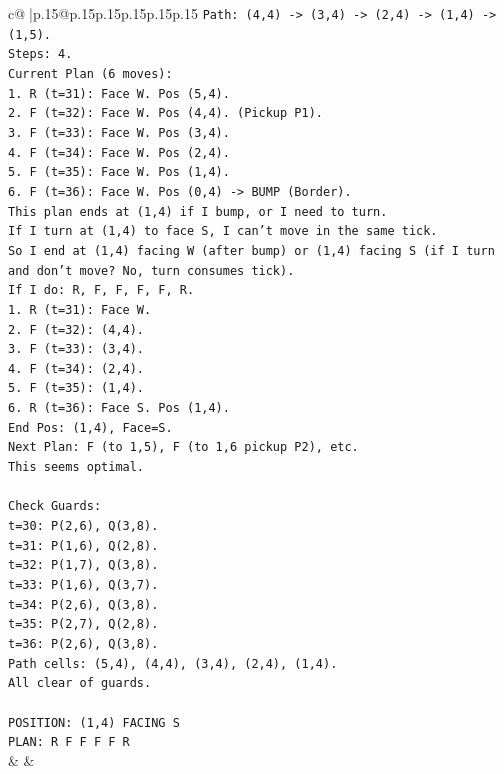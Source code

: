 \documentclass{article}
\begin{document}
{\begin{supertabular}{c@{$\;$}|p{.15\linewidth}@{}p{.15\linewidth}p{.15\linewidth}p{.15\linewidth}p{.15\linewidth}p{.15\linewidth}}
{{{\texttt{Path: (4,4) {-}> (3,4) {-}> (2,4) {-}> (1,4) {-}> (1,5).} \\
\texttt{Steps: 4.} \\
\texttt{Current Plan (6 moves):} \\
\texttt{1. R (t=31): Face W. Pos (5,4).} \\
\texttt{2. F (t=32): Face W. Pos (4,4). (Pickup P1).} \\
\texttt{3. F (t=33): Face W. Pos (3,4).} \\
\texttt{4. F (t=34): Face W. Pos (2,4).} \\
\texttt{5. F (t=35): Face W. Pos (1,4).} \\
\texttt{6. F (t=36): Face W. Pos (0,4) {-}> BUMP (Border).} \\
\texttt{This plan ends at (1,4) if I bump, or I need to turn.} \\
\texttt{If I turn at (1,4) to face S, I can't move in the same tick.} \\
\texttt{So I end at (1,4) facing W (after bump) or (1,4) facing S (if I turn and don't move? No, turn consumes tick).} \\
\texttt{If I do: R, F, F, F, F, R.} \\
\texttt{1. R (t=31): Face W.} \\
\texttt{2. F (t=32): (4,4).} \\
\texttt{3. F (t=33): (3,4).} \\
\texttt{4. F (t=34): (2,4).} \\
\texttt{5. F (t=35): (1,4).} \\
\texttt{6. R (t=36): Face S. Pos (1,4).} \\
\texttt{End Pos: (1,4), Face=S.} \\
\texttt{Next Plan: F (to 1,5), F (to 1,6 pickup P2), etc.} \\
\texttt{This seems optimal.} \\
\\ 
\texttt{Check Guards:} \\
\texttt{t=30: P(2,6), Q(3,8).} \\
\texttt{t=31: P(1,6), Q(2,8).} \\
\texttt{t=32: P(1,7), Q(3,8).} \\
\texttt{t=33: P(1,6), Q(3,7).} \\
\texttt{t=34: P(2,6), Q(3,8).} \\
\texttt{t=35: P(2,7), Q(2,8).} \\
\texttt{t=36: P(2,6), Q(3,8).} \\
\texttt{Path cells: (5,4), (4,4), (3,4), (2,4), (1,4).} \\
\texttt{All clear of guards.} \\
\\ 
\texttt{POSITION: (1,4) FACING S} \\
\texttt{PLAN: R F F F F R} \\
            }
        }
    }
    & & \\ \\


\end{supertabular}}
\end{document}
